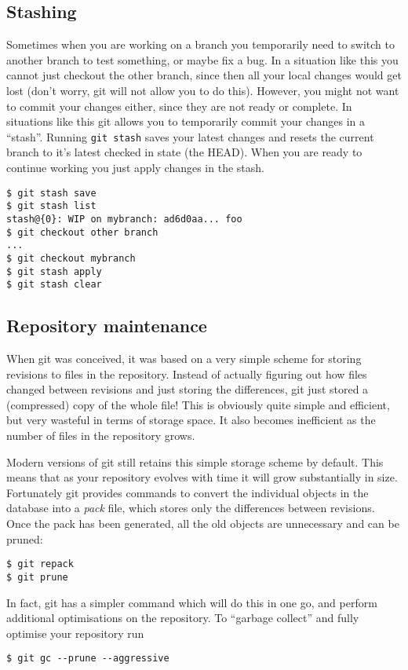 \documentclass[a4paper,10pt]{article}
\begin{document}
\subsection{Stashing}
Sometimes when you are working on a branch you temporarily need to switch to
another branch to test something, or maybe fix a bug. In a situation like this
you cannot just checkout the other branch, since then all your local changes
would get lost (don't worry, git will not allow you to do this). However, you
might not want to commit your changes either, since they are not ready or
complete. In situations like this git allows you to temporarily commit your
changes in a ``stash''. Running \texttt{git stash} saves your latest changes
and resets the current branch to it's latest checked in state (the HEAD). When
you are ready to continue working you just apply changes in the stash.
\begin{verbatim}
$ git stash save
$ git stash list
stash@{0}: WIP on mybranch: ad6d0aa... foo
$ git checkout other branch
...
$ git checkout mybranch
$ git stash apply
$ git stash clear
\end{verbatim}


\subsection{Repository maintenance}
When git was conceived, it was based on a very simple scheme for storing
revisions to files in the repository. Instead of actually figuring out how
files changed between revisions and just storing the differences, git just
stored a (compressed) copy of the whole file! This is obviously quite simple and efficient,
but very wasteful in terms of storage space. It also becomes inefficient as
the number of files in the repository grows. 

Modern versions of git still retains this simple storage scheme by default.
This means that as your repository evolves with time it will grow
substantially in size. Fortunately git provides commands to convert the
individual objects in the database into a \emph{pack} file, which stores only
the differences between revisions. Once the pack has been generated, all the
old objects are unnecessary and can be pruned:
\begin{verbatim}
$ git repack
$ git prune
\end{verbatim}
In fact, git has a simpler command which will do this in one go, and
perform additional optimisations on the repository. To ``garbage collect'' and
fully optimise your repository run
\begin{verbatim}
$ git gc --prune --aggressive
\end{verbatim}
\end{document}
